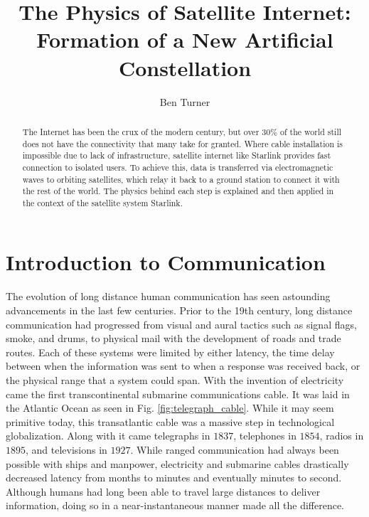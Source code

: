 \documentclass[10pt]{article}
\begin{document}
\def\rcurs{{\mbox{$\resizebox{.16in}{.08in}{\texttt{[image: griffiths\_r/ScriptR.pdf]}}$}}}

\title{The Physics of Satellite Internet: Formation of a New Artificial Constellation}
\author{Ben Turner}

\maketitle

\begin{abstract}

The Internet has been the crux of the modern century, but over $30\%$ of the world still does not have the connectivity that many take for granted. Where cable installation is impossible due to lack of infrastructure, satellite internet like Starlink provides fast connection to isolated users. To achieve this, data is transferred via electromagnetic waves to orbiting satellites, which relay it back to a ground station to connect it with the rest of the world. The physics behind each step is explained and then applied in the context of the satellite system Starlink.

\end{abstract}

\pagebreak

\tableofcontents

\pagebreak

\section{Introduction to Communication}
\label{intro}

The evolution of long distance human communication has seen astounding advancements in the last few centuries. Prior to the 19th century, long distance communication had progressed from visual and aural tactics such as signal flags, smoke, and drums, to physical mail with the development of roads and trade routes. Each of these systems were limited by either latency, the time delay between when the information was sent to when a response was received back, or the physical range that a system could span. With the invention of electricity came the first transcontinental submarine communications cable. It was laid in the Atlantic Ocean as seen in Fig. \ref{fig:telegraph_cable}. While it may seem primitive today, this transatlantic cable was a massive step in technological globalization. Along with it came telegraphs in $1837$, telephones in $1854$, radios in $1895$, and televisions in $1927$. While ranged communication had always been possible with ships and manpower, electricity and submarine cables drastically decreased latency from months to minutes and eventually minutes to second. Although humans had long been able to travel large distances to deliver information, doing so in a near-instantaneous manner made all the difference.
\end{document}
